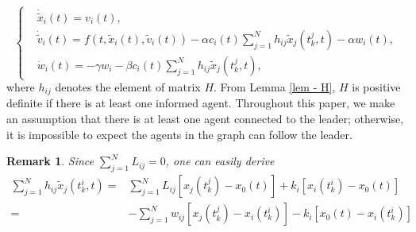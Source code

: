\documentclass[review]{elsarticle}
\newtheorem{rmk}{Remark}
\begin{document}
\begin{equation}\label{protocol-a }
\left\{\begin{aligned}
&\dot {\tilde{x}}_i(t) = v_i(t),\\
&\dot {\tilde{v}}_i(t) = f\left(t,\tilde{x}_i(t),\tilde{v}_i(t) \right)  - \alpha c_i(t)\sum_{j=1}^{N}h_{ij} \tilde{x}_j(t_k^j,t) - \alpha w_i(t),\\
&\dot{w}_i(t)= -\gamma w_ i -\beta  c_i(t)\sum_{j=1}^{N}h_{ij} \tilde{x}_j(t_k^j,t),
\end{aligned}\right.
\end{equation}
where $h_{ij}$ denotes the element of matrix $H$.  
From Lemma \ref{lem - H}, $H$ is positive definite if there is at least one informed agent. Throughout this paper, we make an assumption that there is at least one agent connected to the leader; otherwise, it is impossible to expect the agents in the graph can follow the leader. 
\begin{rmk}
	Since $\sum_{j=1}^{N}L_{ij} = 0$, one can easily derive 
\begin{equation}
\begin{aligned}
\sum_{j=1}^{N}h_{ij} \tilde{x}_j(t_k^i,t) = & \sum_{j=1}^{N}L_{ij}\left[ x_j(t_k^j) - x_0(t)\right]+k_i\left[ x_i(t_k^i) - x_0(t) \right] \\
=& -\sum_{j=1}^{N} w_{ij} \left[ x_j(t_k^j) - x_i(t_k^i)\right]-k_i \left[ x_0(t) - x_i(t_k^i) \right]
\end{aligned}
\end{equation}
\end{rmk}
\end{document}
